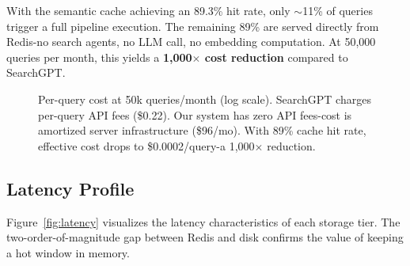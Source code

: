 \documentclass[conference]{IEEEtran}
\begin{document}
With the semantic cache achieving an 89.3\% hit rate, only ${\sim}$11\% of queries trigger a full pipeline execution. The remaining 89\% are served directly from Redis-no search agents, no LLM call, no embedding computation. At 50{,}000 queries per month, this yields a \textbf{1{,}000$\times$ cost reduction} compared to SearchGPT.

\begin{figure}[h]
\centering
{}
\caption{Per-query cost at 50k queries/month (log scale). SearchGPT charges per-query API fees (\$0.22). Our system has zero API fees-cost is amortized server infrastructure (\$96/mo). With 89\% cache hit rate, effective cost drops to \$0.0002/query-a 1{,}000$\times$ reduction.}
\label{fig:cost}
\end{figure}

\subsection{Latency Profile}

Figure~\ref{fig:latency} visualizes the latency characteristics of each storage tier. The two-order-of-magnitude gap between Redis and disk confirms the value of keeping a hot window in memory.
\end{document}
